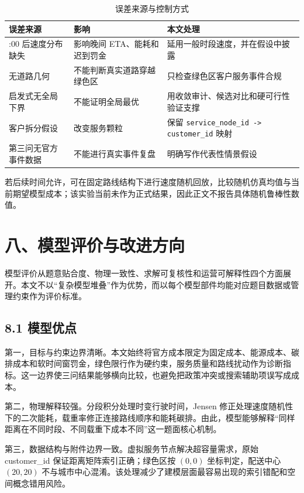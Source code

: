\documentclass[UTF8,zihao=-4,a4paper]{ctexart}
\begin{document}
\begin{table}[H]
\centering
\small
\caption{误差来源与控制方式}
\label{tab:error-sources}
\begin{tabularx}{\textwidth}{>{\raggedright\arraybackslash}X>{\raggedright\arraybackslash}X>{\raggedright\arraybackslash}X}
\toprule
误差来源 & 影响 & 本文处理 \\
\midrule
17:00 后速度分布缺失 & 影响晚间 ETA、能耗和迟到罚金 & 延用一般时段速度，并在假设中披露 \\
无道路几何 & 不能判断真实道路穿越绿色区 & 只检查绿色区客户服务事件合规 \\
启发式无全局下界 & 不能证明全局最优 & 用收敛审计、候选对比和硬可行性验证支撑 \\
客户拆分假设 & 改变服务颗粒 & 保留 \texttt{service\_node\_id -> customer\_id} 映射 \\
第三问无官方事件数据 & 不能进行真实事件复盘 & 明确写作代表性情景假设 \\
\bottomrule
\end{tabularx}
\end{table}

若后续时间允许，可在固定路线结构下进行速度随机回放，比较随机仿真均值与当前期望模型成本；该实验当前未作为正式结果，因此正文不报告具体随机鲁棒性数值。


\section{八、模型评价与改进方向}

模型评价从题意贴合度、物理一致性、求解可复核性和运营可解释性四个方面展开。本文不以“复杂模型堆叠”作为优势，而以每个模型部件均能对应题目数据或管理约束作为评价标准。

\subsection{8.1 模型优点}

第一，目标与约束边界清晰。本文始终将官方成本限定为固定成本、能源成本、碳排成本和软时间窗罚金，绿色限行作为硬约束，服务质量和路线扰动作为诊断指标。这一边界使三问结果能够横向比较，也避免把政策冲突或搜索辅助项误写成成本。

第二，物理解释较强。分段积分处理时变行驶时间，Jensen 修正处理速度随机性下的二次能耗，载重率修正连接路线顺序和能耗碳排。由此，模型能够解释“同样距离在不同时段、不同载重下成本不同”这一题面核心机制。

第三，数据结构与附件边界一致。虚拟服务节点解决超容量需求，原始 customer\_id 保证距离矩阵索引正确；绿色区按 \((0,0)\) 坐标判定，配送中心 \((20,20)\) 不与城市中心混淆。该处理减少了建模层面最容易出现的索引错配和空间概念错用风险。
\end{document}
